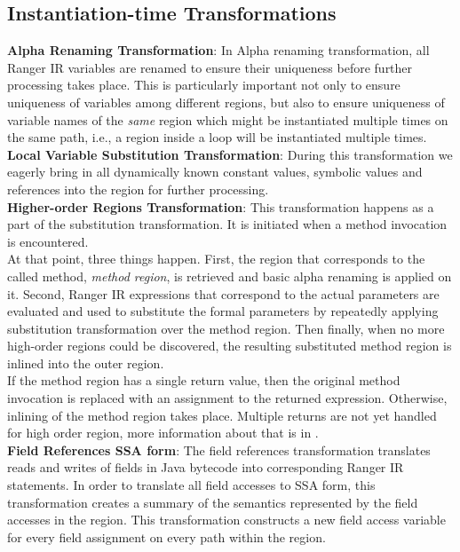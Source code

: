 \subsection{Instantiation-time Transformations}
\textbf{Alpha Renaming Transformation}: In Alpha renaming transformation, all Ranger IR variables are renamed to ensure their uniqueness before further processing takes place. 
%
This is particularly important not only to ensure uniqueness of variables among different regions, but also to ensure uniqueness of variable names of the \textit{same} region which might be instantiated multiple times on the same path, i.e., a region inside a loop will be instantiated multiple times.\\
%
\textbf{Local Variable Substitution Transformation}: During this transformation we eagerly bring in all dynamically known constant values, symbolic values and references into the region for further processing. \\
%
\textbf{Higher-order Regions Transformation}: This transformation happens as a part of the substitution transformation.
%
It is initiated when a method invocation is encountered.\\
%
At that point, three things happen. 
%
First, the region that corresponds to the called method, \textit{method region}, is retrieved and basic alpha renaming is applied on it. 
%
Second, Ranger IR expressions that correspond to the actual parameters are evaluated and used to substitute the formal parameters by repeatedly applying substitution transformation over the method region.
%
Then finally, when no more high-order regions could be discovered, the resulting substituted method region is inlined into the outer region.\\
%
If the method region has a single return value, then the original method invocation is replaced with an assignment to the returned expression.
%
Otherwise, inlining of the method region takes place. 
%
Multiple returns are not yet handled for high order region, more information about that is in .
\\
\textbf{Field References SSA form}: The field references transformation translates reads and writes of fields
in Java bytecode into corresponding Ranger IR statements.
%
In order to translate all field accesses to SSA form, this transformation creates a summary of the semantics
represented by the field accesses in the region.
%
This transformation constructs a new field access variable for every field assignment on every path within the region.
